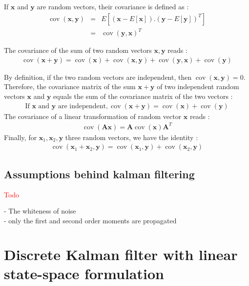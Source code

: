 \documentclass[10pt,oneside]{scrartcl}
\newcommand\vecteur[1]{\boldsymbol#1}
\newcommand\matrice[1]{\mathbf#1}
\newcommand\cov{\operatorname*{cov}}
\begin{document}
If $\vecteur{x}$ and $\vecteur{y}$ are random vectors, their covariance is defined as :
\begin{eqnarray}
\nonumber \cov(\vecteur{x},\vecteur{y}) &=& E[(\vecteur{x} - E[\vecteur{x}]).(\vecteur{y} - E[\vecteur{y}])^T]\\
\nonumber                               &=& \cov(\vecteur{y}, \vecteur{x})^T
\end{eqnarray}

The covariance of the sum of two random vectors $\vecteur{x},\vecteur{y}$ reads :
\begin{eqnarray}
\nonumber \cov(\vecteur{x} + \vecteur{y}) = \cov(\vecteur{x}) + \cov(\vecteur{x},\vecteur{y}) + \cov(\vecteur{y},\vecteur{x}) + \cov(\vecteur{y}) 
\end{eqnarray}

By definition, if the two random vectors are independent, then $\cov(\vecteur{x}, \vecteur{y}) = 0$. Therefore, the covariance matrix of the sum $\vecteur{x}+\vecteur{y}$ of two independent random vectors $\vecteur{x}$ and $\vecteur{y}$ equals the sum of the covariance matrix of the two vectors :
\begin{eqnarray}
\label{eq:preliminaries_esperance_independent} \mbox{If $\vecteur{x}$ and $\vecteur{y}$ are independent}, \cov(\vecteur{x} + \vecteur{y}) = \cov(\vecteur{x})+\cov(\vecteur{y})
\end{eqnarray}
The covariance of a linear transformation of random vector $\vecteur{x}$ reads : 
\begin{eqnarray}
\nonumber \cov(\matrice{A} \vecteur{x}) = \matrice{A}\cov(\vecteur{x})\matrice{A}^T
\end{eqnarray}
Finally, for $\vecteur{x_1},\vecteur{x_2},\vecteur{y}$ three random vectors, we have the identity :
\begin{eqnarray}
\nonumber \cov(\vecteur{x_1} + \vecteur{x_2}, \vecteur{y}) = \cov(\vecteur{x_1},\vecteur{y}) + \cov(\vecteur{x_2},\vecteur{y})
\end{eqnarray}
\subsection{Assumptions behind kalman filtering}

\textcolor{red}{Todo}

- The whiteness of noise\\
- only the first and second order moments are propagated\\

\section{Discrete Kalman filter with linear state-space formulation}
\end{document}

